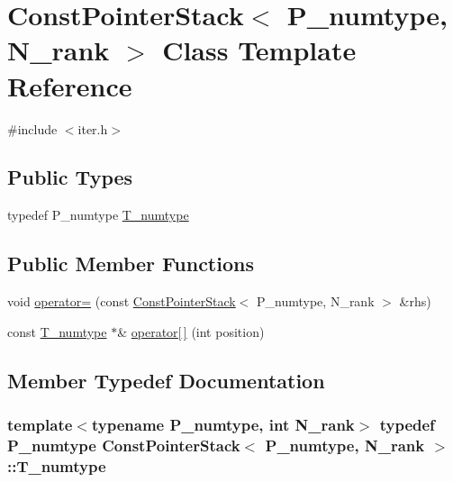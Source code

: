 \hypertarget{classConstPointerStack}{}\section{Const\+Pointer\+Stack$<$ P\+\_\+numtype, N\+\_\+rank $>$ Class Template Reference}
\label{classConstPointerStack}


{\ttfamily \#include $<$iter.\+h$>$}

\subsection*{Public Types}
\begin{DoxyCompactItemize}
\item 
typedef P\+\_\+numtype \hyperlink{classConstPointerStack_a1ec0eb1988b6807cbe3f7aa19cccae16}{T\+\_\+numtype}
\end{DoxyCompactItemize}
\subsection*{Public Member Functions}
\begin{DoxyCompactItemize}
\item 
void \hyperlink{classConstPointerStack_a940b6aae26d11ee6790e9863c2fcdb99}{operator=} (const \hyperlink{classConstPointerStack}{Const\+Pointer\+Stack}$<$ P\+\_\+numtype, N\+\_\+rank $>$ \&rhs)
\item 
const \hyperlink{classConstPointerStack_a1ec0eb1988b6807cbe3f7aa19cccae16}{T\+\_\+numtype} $\ast$\& \hyperlink{classConstPointerStack_ab1fd034d74cdd570703eec2ca02addf8}{operator\mbox{[}$\,$\mbox{]}} (int position)
\end{DoxyCompactItemize}


\subsection{Member Typedef Documentation}
\hypertarget{classConstPointerStack_a1ec0eb1988b6807cbe3f7aa19cccae16}{}
\subsubsection[{T\+\_\+numtype}]{\setlength{\rightskip}{0pt plus 5cm}template$<$typename P\+\_\+numtype, int N\+\_\+rank$>$ typedef P\+\_\+numtype {\bf Const\+Pointer\+Stack}$<$ P\+\_\+numtype, N\+\_\+rank $>$\+::{\bf T\+\_\+numtype}}\label{classConstPointerStack_a1ec0eb1988b6807cbe3f7aa19cccae16}


